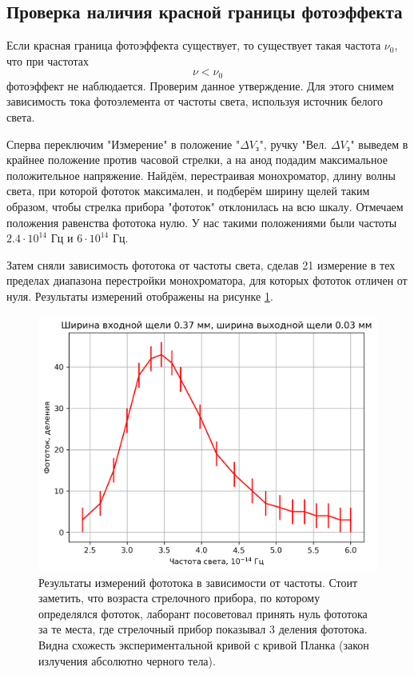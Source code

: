 \documentclass[12pt]{article}
\begin{document}
	\subsection{Проверка наличия красной границы фотоэффекта}
	Если красная граница фотоэффекта существует, то существует такая частота $\nu_0$, что при частотах
	\begin{equation}
		\nu < \nu_0
	\end{equation}
	фотоэффект не наблюдается. Проверим данное утверждение. Для этого снимем зависимость тока фотоэлемента от частоты света, используя источник белого света.
	\par Сперва переключим "{}Измерение"{} в положение "{}$\Delta V_\text{з}$"{}, ручку "{}Вел. $\Delta V_\text{з}$"{} выведем в крайнее положение против часовой стрелки, а на анод подадим максимальное положительное напряжение. Найдём, перестраивая монохроматор, длину волны света, при которой фототок максимален, и подберём ширину щелей таким образом, чтобы стрелка прибора "{}фототок"{} отклонилась на всю шкалу. Отмечаем положения равенства фототока нулю. У нас такими положениями были частоты $2.4\cdot 10^{14}$ Гц и $6\cdot 10^{14}$ Гц.
	\par Затем сняли зависимость фототока от частоты света, сделав 21 измерение в тех пределах диапазона перестройки монохроматора, для которых фототок отличен от нуля. Результаты измерений отображены на рисунке \ref{fig:3}.
	\begin{figure}[htbp]
		\centering
		\includegraphics[width=1\linewidth]{../plots/2.png}
		\caption{Результаты измерений фототока в зависимости от частоты. Стоит заметить, что возраста стрелочного прибора, по которому определялся фототок, лаборант посоветовал принять нуль фототока за те места, где стрелочный прибор показывал 3 деления фототока. Видна схожесть экспериментальной кривой с кривой Планка (закон излучения абсолютно черного тела).}
		\label{fig:3}
	\end{figure}
\end{document}
